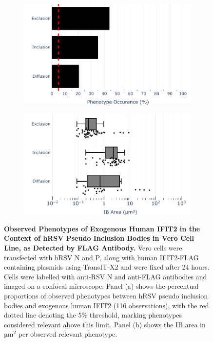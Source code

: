 \begin{figure}
    \begin{subfigure}{0.495\textwidth}
        \caption{}
        \includegraphics[width=1\linewidth]{09. Chapter 4/Figs/01. pIB/03. IFIT2/04. IFIT2-FLAG/03. FLAG/01. bar_hi2f_hnhp.pdf}
    \end{subfigure}
    \begin{subfigure}{0.495\textwidth}
        \caption{}
        \includegraphics[width=1\linewidth]{09. Chapter 4/Figs/01. pIB/03. IFIT2/04. IFIT2-FLAG/03. FLAG/02. box_hi2f_hnhp.pdf}
    \end{subfigure}
    \caption[Observed Phenotypes of Exogenous Human IFIT2 in the Context of hRSV Pseudo Inclusion Bodies in Vero Cell Line, as Detected by FLAG Antibody.]{\textbf{Observed Phenotypes of Exogenous Human IFIT2 in the Context of hRSV Pseudo Inclusion Bodies in Vero Cell Line, as Detected by FLAG Antibody.} Vero cells were transfected with hRSV N and P, along with human IFIT2-FLAG containing plasmids using TransIT-X2 and were fixed after 24 hours. Cells were labelled with anti-RSV N and anti-FLAG antibodies and imaged on a confocal microscope. Panel (a) shows the percentual proportions of observed phenotypes between hRSV pseudo inclusion bodies and exogenous human IFIT2 (116 observations), with the red dotted line denoting the 5\% threshold, marking phenotypes considered relevant above this limit. Panel (b) shows the IB area in \(\mbox{µm}^2\) per observed relevant phenotype.}
    \label{fig:Observed Phenotypes of Exogenous Human IFIT2 in the Context of hRSV Pseudo Inclusion Bodies in Vero Cell Line, as Detected by FLAG Antibody}
\end{figure}

